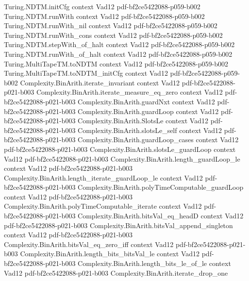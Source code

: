 \begin{theorem}
\proofstep
  {Turing.NDTM.initCfg}
  {context}
  {Vad12}
  {pdf-bf2ce5422088-p059-b002}
\proofstep
  {Turing.NDTM.runWith}
  {context}
  {Vad12}
  {pdf-bf2ce5422088-p059-b002}
\proofstep
  {Turing.NDTM.runWith_nil}
  {context}
  {Vad12}
  {pdf-bf2ce5422088-p059-b002}
\proofstep
  {Turing.NDTM.runWith_cons}
  {context}
  {Vad12}
  {pdf-bf2ce5422088-p059-b002}
\proofstep
  {Turing.NDTM.stepWith_of_halt}
  {context}
  {Vad12}
  {pdf-bf2ce5422088-p059-b002}
\proofstep
  {Turing.NDTM.runWith_of_halt}
  {context}
  {Vad12}
  {pdf-bf2ce5422088-p059-b002}
\proofstep
  {Turing.MultiTapeTM.toNDTM}
  {context}
  {Vad12}
  {pdf-bf2ce5422088-p059-b002}
\proofstep
  {Turing.MultiTapeTM.toNDTM_initCfg}
  {context}
  {Vad12}
  {pdf-bf2ce5422088-p059-b002}
\proofstep
  {Complexity.BinArith.iterate_invariant}
  {context}
  {Vad12}
  {pdf-bf2ce5422088-p021-b003}
\proofstep
  {Complexity.BinArith.iterate_measure_eq_zero}
  {context}
  {Vad12}
  {pdf-bf2ce5422088-p021-b003}
\proofstep
  {Complexity.BinArith.guardNxt}
  {context}
  {Vad12}
  {pdf-bf2ce5422088-p021-b003}
\proofstep
  {Complexity.BinArith.guardLoop}
  {context}
  {Vad12}
  {pdf-bf2ce5422088-p021-b003}
\proofstep
  {Complexity.BinArith.SlotsLe}
  {context}
  {Vad12}
  {pdf-bf2ce5422088-p021-b003}
\proofstep
  {Complexity.BinArith.slotsLe_self}
  {context}
  {Vad12}
  {pdf-bf2ce5422088-p021-b003}
\proofstep
  {Complexity.BinArith.guardLoop_cases}
  {context}
  {Vad12}
  {pdf-bf2ce5422088-p021-b003}
\proofstep
  {Complexity.BinArith.slotsLe_guardLoop}
  {context}
  {Vad12}
  {pdf-bf2ce5422088-p021-b003}
\proofstep
  {Complexity.BinArith.length_guardLoop_le}
  {context}
  {Vad12}
  {pdf-bf2ce5422088-p021-b003}
\proofstep
  {Complexity.BinArith.length_iterate_guardLoop_le}
  {context}
  {Vad12}
  {pdf-bf2ce5422088-p021-b003}
\proofstep
  {Complexity.BinArith.polyTimeComputable_guardLoop}
  {context}
  {Vad12}
  {pdf-bf2ce5422088-p021-b003}
\proofstep
  {Complexity.BinArith.polyTimeComputable_iterate}
  {context}
  {Vad12}
  {pdf-bf2ce5422088-p021-b003}
\proofstep
  {Complexity.BinArith.bitsVal_eq_headD}
  {context}
  {Vad12}
  {pdf-bf2ce5422088-p021-b003}
\proofstep
  {Complexity.BinArith.bitsVal_append_singleton}
  {context}
  {Vad12}
  {pdf-bf2ce5422088-p021-b003}
\proofstep
  {Complexity.BinArith.bitsVal_eq_zero_iff}
  {context}
  {Vad12}
  {pdf-bf2ce5422088-p021-b003}
\proofstep
  {Complexity.BinArith.length_bits_bitsVal_le}
  {context}
  {Vad12}
  {pdf-bf2ce5422088-p021-b003}
\proofstep
  {Complexity.BinArith.length_bits_le_of_le}
  {context}
  {Vad12}
  {pdf-bf2ce5422088-p021-b003}
\proofstep
  {Complexity.BinArith.iterate_drop_one}

\end{theorem}
